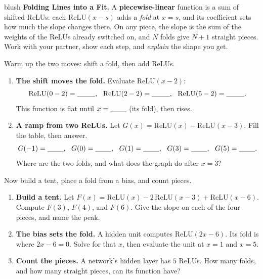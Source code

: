 \documentclass[10pt]{article}
\newcommand{\relu}{\mathrm{ReLU}}
\begin{document}
\namepartnerperiod

\vspace{0.10in}

\begin{headlinebox}{blush}
\small\textbf{Folding Lines into a Fit.} A \textbf{piecewise-linear} function is a sum of shifted ReLUs:
each $\relu(x-s)$ adds a \emph{fold} at $x=s$, and its coefficient sets how much the slope changes there. On
any piece, the slope is the sum of the weights of the ReLUs already switched on, and $N$ folds give $N+1$
straight pieces. Work with your partner, show each step, and \emph{explain} the shape you get.
\end{headlinebox}

\vspace{0.10in}

\begin{tcolorbox}[colback=white, colframe=black!40, title=\textbf{Tier R --- Remediate},
    fonttitle=\bfseries, arc=1.5mm, left=3mm, right=3mm, top=2mm, bottom=2mm, breakable]
Warm up the two moves: shift a fold, then add ReLUs.
\begin{enumerate}[leftmargin=1.7em, itemsep=8pt]
  \item \textbf{The shift moves the fold.} Evaluate $\relu(x-2)$:
        \[ \relu(0-2)=\blank{0.9cm},\ \ \relu(2-2)=\blank{0.9cm},\ \ \relu(5-2)=\blank{0.9cm}. \]
        This function is flat until $x=\blank{0.8cm}$ (its fold), then rises.
  \item \textbf{A ramp from two ReLUs.} Let $G(x)=\relu(x)-\relu(x-3)$. Fill the table, then answer.
        \[ G(-1)=\blank{0.8cm},\ \ G(0)=\blank{0.8cm},\ \ G(1)=\blank{0.8cm},\ \ G(3)=\blank{0.8cm},\ \ G(5)=\blank{0.8cm}. \]
        Where are the two folds, and what does the graph do after $x=3$? \writeline
\end{enumerate}
\end{tcolorbox}

\begin{tcolorbox}[colback=white, colframe=black!40, title=\textbf{Tier A --- Approaching Proficiency},
    fonttitle=\bfseries, arc=1.5mm, left=3mm, right=3mm, top=2mm, bottom=2mm, breakable]
Now build a tent, place a fold from a bias, and count pieces.
\begin{enumerate}[leftmargin=1.7em, itemsep=9pt]
  \item \textbf{Build a tent.} Let $F(x)=\relu(x)-2\,\relu(x-3)+\relu(x-6)$. Compute $F(3)$, $F(4)$, and
        $F(6)$. Give the slope on each of the four pieces, and name the peak. 
  \item \textbf{The bias sets the fold.} A hidden unit computes $\relu(2x-6)$. Its fold is where
        $2x-6=0$. Solve for that $x$, then evaluate the unit at $x=1$ and $x=5$. \writeline
  \item \textbf{Count the pieces.} A network's hidden layer has $5$ ReLUs. How many folds, and how many
        straight pieces, can its function have? \writeline
\end{enumerate}
\end{tcolorbox}
\end{document}

